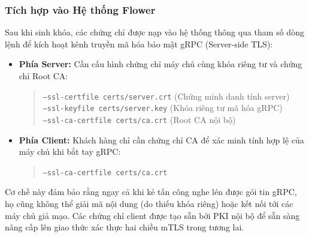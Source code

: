 \subsubsection{Tích hợp vào Hệ thống Flower}
Sau khi sinh khóa, các chứng chỉ được nạp vào hệ thống thông qua tham số dòng lệnh để kích hoạt kênh truyền mã hóa bảo mật gRPC (Server-side TLS):

\begin{itemize}
    \item \textbf{Phía Server:} Cần cấu hình chứng chỉ máy chủ cùng khóa riêng tư và chứng chỉ Root CA:
    \begin{quote}
    \texttt{--ssl-certfile certs/server.crt} (Chứng minh danh tính server)\\
    \texttt{--ssl-keyfile certs/server.key} (Khóa riêng tư mã hóa gRPC)\\
    \texttt{--ssl-ca-certfile certs/ca.crt} (Root CA nội bộ)
    \end{quote}
    \item \textbf{Phía Client:} Khách hàng chỉ cần chứng chỉ CA để xác minh tính hợp lệ của máy chủ khi bắt tay gRPC:
    \begin{quote}
    \texttt{--ssl-ca-certfile certs/ca.crt}
    \end{quote}
\end{itemize}

Cơ chế này đảm bảo rằng ngay cả khi kẻ tấn công nghe lén được gói tin gRPC, họ cũng không thể giải mã nội dung (do thiếu khóa riêng) hoặc kết nối tới các máy chủ giả mạo. Các chứng chỉ client được tạo sẵn bởi PKI nội bộ để sẵn sàng nâng cấp lên giao thức xác thực hai chiều mTLS trong tương lai.